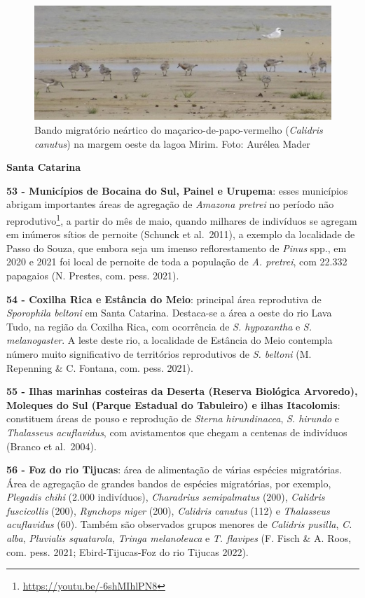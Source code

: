\documentclass[
  oneside]{scrbook}
\DeclareRobustCommand{\href}[2]{#2\footnote{\url{#1}}}
\begin{document}
\begin{figure}[H]

{\centering \includegraphics[width=0.75\linewidth]{imagens/cap07/Figura_7.7} 

}

\caption{Bando migratório neártico do maçarico-de-papo-vermelho (\emph{Calidris canutus}) na margem oeste da lagoa Mirim. Foto: Aurélea Mader}\label{fig:27}
\end{figure}



\textbf{Santa Catarina}

\textbf{53 - Municípios de Bocaina do Sul, Painel e Urupema}: esses municípios abrigam \href{https://youtu.be/-6shMIhlPN8}{importantes áreas de agregação de \emph{Amazona pretrei} no período não reprodutivo}, a partir do mês de maio, quando milhares de indivíduos se agregam em inúmeros sítios de pernoite (Schunck et al.~2011), a exemplo da localidade de Passo do Souza, que embora seja um imenso reflorestamento de \emph{Pinus} spp., em 2020 e 2021 foi local de pernoite de toda a população de \emph{A. pretrei}, com 22.332 papagaios (N. Prestes, com. pess. 2021).

\textbf{54 - Coxilha Rica e Estância do Meio}: principal área reprodutiva de \emph{Sporophila beltoni} em Santa Catarina. Destaca-se a área a oeste do rio Lava Tudo, na região da Coxilha Rica, com ocorrência de \emph{S. hypoxantha} e \emph{S. melanogaster}. A leste deste rio, a localidade de Estância do Meio contempla número muito significativo de territórios reprodutivos de \emph{S. beltoni} (M. Repenning \& C. Fontana, com. pess. 2021).

\textbf{55 - Ilhas marinhas costeiras da Deserta (Reserva Biológica Arvoredo), Moleques do Sul (Parque Estadual do Tabuleiro) e ilhas Itacolomis}: constituem áreas de pouso e reprodução de \emph{Sterna hirundinacea}, \emph{S. hirundo} e \emph{Thalasseus acuflavidus}, com avistamentos que chegam a centenas de indivíduos (Branco et al.~2004).

\textbf{56 - Foz do rio Tijucas}: área de alimentação de várias espécies migratórias. Área de agregação de grandes bandos de espécies migratórias, por exemplo, \emph{Plegadis chihi} (2.000 indivíduos), \emph{Charadrius semipalmatus} (200), \emph{Calidris fuscicollis} (200), \emph{Rynchops niger} (200), \emph{Calidris canutus} (112) e \emph{Thalasseus acuflavidus} (60). Também são observados grupos menores de \emph{Calidris pusilla}, \emph{C. alba}, \emph{Pluvialis squatarola}, \emph{Tringa melanoleuca} e \emph{T. flavipes} (F. Fisch \& A. Roos, com. pess. 2021; Ebird-Tijucas-Foz do rio Tijucas 2022).
\end{document}
